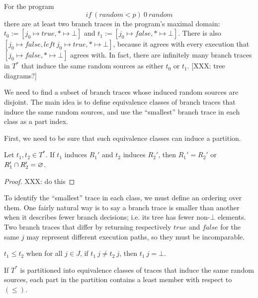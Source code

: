 \begin{example}
For the program
\begin{equation}
	if~(random < p)~0~random
\end{equation}
there are at least two branch traces in the program's maximal domain: $t_0 := [j_0 \mapsto true, * \mapsto \bot]$ and $t_1 := [j_0 \mapsto false, * \mapsto \bot]$.
There is also $[j_0 \mapsto false, left~j_0 \mapsto true, * \mapsto \bot]$, because it agrees with every execution that $[j_0 \mapsto false, * \mapsto \bot]$ agrees with.
In fact, there are infinitely many branch traces in $T^*$ that induce the same random sources as either $t_0$ or $t_1$.
[XXX: tree diagrams?]
\exampleqed
\end{example}

We need to find a subset of branch traces whose induced random sources are disjoint.
The main idea is to define equivalence classes of branch traces that induce the same random sources, and use the ``smallest'' branch trace in each class as a part index.

First, we need to be sure that such equivalence classes can induce a partition.

\begin{theorem}
Let $t_1,t_2 \in T^*$.
If $t_1$ induces $R_1'$ and $t_2$ induces $R_2'$, then $R_1' = R_2'$ or $R_1' \cap R_2' = \varnothing$.
\end{theorem}
\begin{proof}
XXX: do this
\end{proof}

To identify the ``smallest'' trace in each class, we must define an ordering over them.
One fairly natural way is to say a branch trace is smaller than another when it describes fewer branch decisions; i.e. its tree has fewer non-$\bot$ elements.
Two branch traces that differ by returning respectively $true$ and $false$ for the same $j$ may represent different execution paths, so they must be incomparable.

\begin{definition}
$t_1 \leq t_2$ when for all $j \in J$, if $t_1~j \neq t_2~j$, then $t_1~j = \bot$.
\end{definition}

If $T^*$ is partitioned into equivalence classes of traces that induce the same random sources, each part in the partition contains a least member with respect to $(\leq)$.

